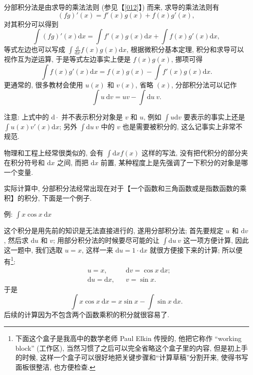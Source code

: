 \begin{tcolorbox}[size=fbox, breakable, enhanced jigsaw, title={分部积分法 (integration by parts)}]

分部积分法是由求导的乘法法则 (参见【\ref{012}】) 而来, 求导的乘法法则有 \[
(fg)'(x)=f'(x)g(x)+f(x)g'(x),
\] 对其积分可以得到 \[
\int(fg)'(x)\mathrm{d}x=\int f'(x)g(x)\mathrm{d}x+\int f(x)g'(x)\mathrm{d}x,
\] 等式左边也可以写成
\(\int\frac{\mathrm{d}}{\mathrm{d}x}f(x)g(x)\mathrm{d}x\),
根据微积分基本定理, 积分和求导可以视作互为逆运算, 于是等式左边事实上便是
\(f(x)g(x)\), 挪项可得 \[
\int f(x)g'(x)\mathrm{d}x=f(x)g(x)-\int f'(x)g(x)\mathrm{d}x.
\] 更通常的, 很多教材会使用 \(u(x)\) 和 \(v(x)\), 省略 \((x)\),
分部积分法可以记作 \[
\boxed{\int u\ \mathrm{d}v=uv-\int \mathrm{d}u\ v}.
\]

\begin{newquote}
注意: 上式中的 \(\mathrm{d}\cdot\) 并不表示积分对象是 \(v\) 和 \(u\),
例如 \(\int u\mathrm{d}v\) 要表示的事实上还是
\(\int u(x)v'(x)\mathrm{d}x\); 另外 \(\int \mathrm{d}u\ v\) 中的 \(v\)
也是需要被积分的, 这么记事实上非常不规范.

物理和工程上经常很类似的, 会有 \(\int\mathrm{d}x f(x)\) 这样的写法,
没有把代积分的部分夹在积分符号和 \(\mathrm{d}x\) 之间, 而把
\(\mathrm{d}x\) 前置, 某种程度上是先强调了一下积分的对象是哪一个变量.
\end{newquote}

实际计算中,
分部积分法经常出现在对于【一个函数和三角函数或是指数函数的乘积】的积分,
下面是一个例子.

\begin{newquote}
例: \(\int x\cos x\ \mathrm{d}x\)

这个积分是用先前的知识是无法直接进行的, 遂用分部积分法; 首先要规定 \(u\)
和 \(\mathrm{d}v\), 然后求 \(\mathrm{d}u\) 和 \(v\);
用部分积分法的时候要尽可能的让 \(\int \mathrm{d}u\ v\) 这一项方便计算,
因此这一题中, 我们选取 \(u=x\), 这样一来
\(\mathrm{d}u=1\cdot\mathrm{d}x\) 就很方便接下来的计算;
所以便有\footnote{下面这个盒子是我高中的数学老师 Paul Elkin 传授的,
  他把它称作 ``working block'' (工作区),
  当然习惯了之后可以完全省略这个盒子里的内容, 但是初上手的时候,
  这样一个盒子可以很好地把关键步骤和``计算草稿''分割开来,
  使得书写面板很整洁, 也方便检查.}: \[
\boxed{\begin{aligned}
&u=x,&&\mathrm{d}v=\cos x\ \mathrm{d}x;\\
&\mathrm{d}u=\mathrm{d}x,&&v=\sin x.
\end{aligned}}
\] 于是 \[
\int x\cos x\ \mathrm{d}x=x\sin x-\int\sin x\ \mathrm{d}x.
\] 后续的计算因为不包含两个函数乘积的积分就很容易了.


\end{newquote}
\end{tcolorbox}
